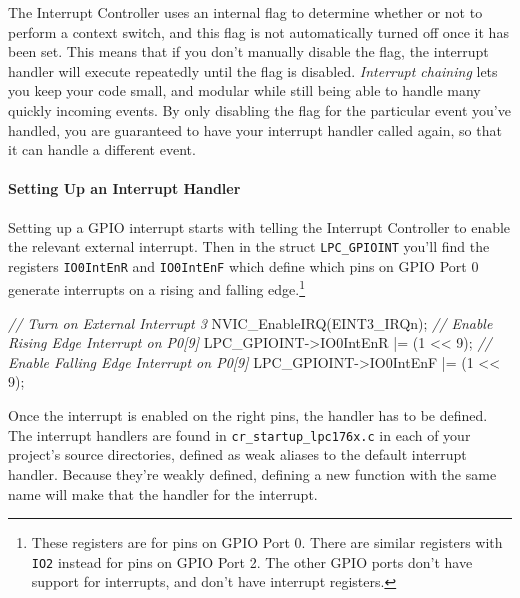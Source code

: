 \documentclass[]{article}
\newenvironment{Shaded}{\begin{snugshade}}{\end{snugshade}}
\newcommand{\DecValTok}[1]{\textcolor[rgb]{0.00,0.00,0.81}{{#1}}}
\newcommand{\CommentTok}[1]{\textcolor[rgb]{0.56,0.35,0.01}{\textit{{#1}}}}
\newcommand{\NormalTok}[1]{{#1}}
\begin{document}
The Interrupt Controller uses an internal flag to determine whether or
not to perform a context switch, and this flag is not automatically
turned off once it has been set. This means that if you don't manually
disable the flag, the interrupt handler will execute repeatedly until
the flag is disabled. \emph{Interrupt chaining} lets you keep your code
small, and modular while still being able to handle many quickly
incoming events. By only disabling the flag for the particular event
you've handled, you are guaranteed to have your interrupt handler called
again, so that it can handle a different event.

\paragraph{Setting Up an Interrupt Handler}

Setting up a GPIO interrupt starts with telling the Interrupt Controller
to enable the relevant external interrupt. Then in the struct
\texttt{LPC\_GPIOINT} you'll find the registers \texttt{IO0IntEnR} and
\texttt{IO0IntEnF} which define which pins on GPIO Port 0 generate
interrupts on a rising and falling edge.\footnote{These registers are
  for pins on GPIO Port 0. There are similar registers with \texttt{IO2}
  instead for pins on GPIO Port 2. The other GPIO ports don't have
  support for interrupts, and don't have interrupt registers.}

\begin{Shaded}
\begin{Highlighting}[]
    \CommentTok{// Turn on External Interrupt 3}
    \NormalTok{NVIC_EnableIRQ(EINT3_IRQn);}
    \CommentTok{// Enable Rising Edge Interrupt on P0[9]}
    \NormalTok{LPC_GPIOINT->IO0IntEnR |= (}\DecValTok{1} \NormalTok{<< }\DecValTok{9}\NormalTok{);}
    \CommentTok{// Enable Falling Edge Interrupt on P0[9]}
    \NormalTok{LPC_GPIOINT->IO0IntEnF |= (}\DecValTok{1} \NormalTok{<< }\DecValTok{9}\NormalTok{);}
\end{Highlighting}
\end{Shaded}

Once the interrupt is enabled on the right pins, the handler has to be
defined. The interrupt handlers are found in
\texttt{cr\_startup\_lpc176x.c} in each of your project's source
directories, defined as weak aliases to the default interrupt handler.
Because they're weakly defined, defining a new function with the same
name will make that the handler for the interrupt.
\end{document}
